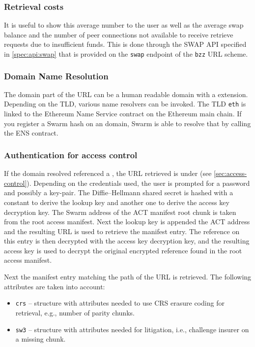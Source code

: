 \subsubsection{Retrieval costs}


It is useful to show this average number to the user as well as the average swap balance and the number of peer connections not available to receive retrieve requests due to insufficient funds. This is done through the SWAP API specified in \ref{spec:api:swap} that is provided on the \lstinline{swap} endpoint of the \lstinline{bzz} URL scheme.


\subsubsection{Domain Name Resolution}

The domain part of the URL can be a human readable domain with a  extension. Depending on the TLD, various name resolvers can be invoked. The TLD \lstinline{eth} is linked to the Ethereum Name Service contract on the Ethereum main chain. If you register a Swarm hash on an  domain, Swarm is able to resolve that by calling the ENS contract. 

\subsubsection{Authentication for access control}

If the domain resolved referenced a , the URL retrieved is under  (see \ref{sec:access-control}). 
Depending on the credentials used, the user is prompted for a password and possibly a key-pair. 
The Diffie--Hellmann shared secret is hashed with a constant to derive the lookup key and another one to derive the access key decryption key. The Swarm address of the ACT manifest root chunk is taken from the root access manifest. 
Next the lookup key is appended the ACT address and the resulting URL is used to retrieve the manifest entry. The reference on this entry is then decrypted with the access key decryption key, and the resulting access key is used to decrypt the original encrypted reference found in the root access manifest.

Next the manifest entry matching the path of the URL is retrieved. The following attributes are taken into account:

\begin{itemize}
    \item \lstinline{crs} -- {
    structure with attributes needed to use CRS erasure coding for retrieval, e.g., number of parity chunks}.
    \item \lstinline{sw3} -- { structure with attributes needed for litigation, i.e., challenge insurer on a missing chunk}. 
\end{itemize}


